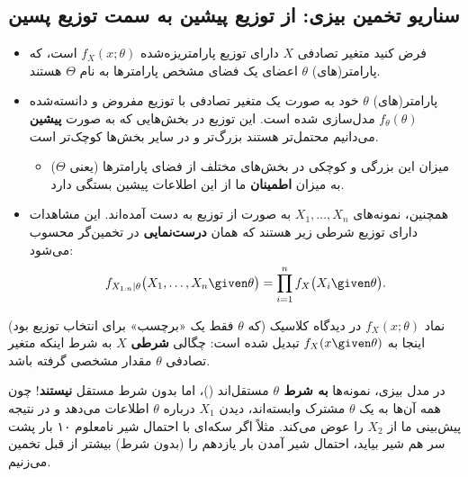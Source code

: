 \subsection{سناریو تخمین بیزی: از توزیع پیشین به سمت توزیع پسین}
\begin{itemize}
\item فرض کنید متغیر تصادفی $X$ دارای توزیع پارامتریزه‌شده $f_X(x;\theta)$ است، که پارامتر(های) $\theta$ اعضای یک فضای مشخص پارامترها به نام $\Theta$ هستند.
\item پارامتر(های) $\theta$ خود به صورت یک متغیر تصادفی با توزیع مفروض و دانسته‌شده $f_\theta(\theta)$ مدل‌سازی شده است. این توزیع در بخش‌هایی که به صورت \textbf{پیشین } می‌دانیم محتمل‌تر هستند بزرگ‌تر و در سایر بخش‌ها کوچک‌تر است.
\begin{itemize}
\item میزان این بزرگی و کوچکی در بخش‌های مختلف از فضای پارامترها (یعنی $\Theta$) به میزان \textbf{اطمینان} ما از این اطلاعات پیشین بستگی دارد.
\end{itemize}
\item همچنین، نمونه‌های $X_1,\ldots,X_n$ به صورت  از توزیع به دست آمده‌اند. این مشاهدات دارای توزیع شرطی زیر هستند که همان \textbf{درست‌نمایی } در تخمین‌گر  محسوب می‌شود:
\[
f_{X_{1:n}|\theta}\big(X_1,\ldots,X_n\given\theta\big)=\prod_{i=1}^nf_X\big(X_i\given\theta\big).
\]
\end{itemize}
نماد $f_X(x;\theta)$ در دیدگاه کلاسیک (که $\theta$ فقط یک «برچسب» برای انتخاب توزیع بود) اینجا به $f_X(x\given\theta)$ تبدیل شده است: چگالی \textbf{شرطی} $X$ به شرط اینکه متغیر تصادفی $\theta$ مقدار مشخصی گرفته باشد.

\begin{warning}
\warntitle در مدل بیزی، نمونه‌ها \textbf{به شرط $\theta$} مستقل‌اند ()، اما بدون شرط مستقل \textbf{نیستند}! چون همه آن‌ها به یک $\theta$ مشترک وابسته‌اند، دیدن $X_1$ درباره $\theta$ اطلاعات می‌دهد و در نتیجه پیش‌بینی ما از $X_2$ را عوض می‌کند. مثلاً اگر سکه‌ای با احتمال شیر نامعلوم ۱۰ بار پشت سر هم شیر بیاید، احتمال شیر آمدن بار یازدهم را (بدون شرط) بیشتر از قبل تخمین می‌زنیم.
\end{warning}

